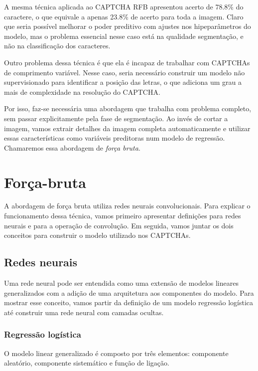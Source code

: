 \documentclass[12pt,]{report}
\begin{document}
A mesma técnica aplicada ao CAPTCHA RFB apresentou acerto de 78.8\% do
caractere, o que equivale a apenas 23.8\% de acerto para toda a imagem.
Claro que seria possível melhorar o poder preditivo com ajustes nos
hipeparâmetros do modelo, mas o problema essencial nesse caso está na
qualidade segmentação, e não na classificação dos caracteres.

Outro problema dessa técnica é que ela é incapaz de trabalhar com
CAPTCHAs de comprimento variável. Nesse caso, seria necessário construir
um modelo não supervisionado para identificar a posição das letras, o
que adiciona um grau a mais de complexidade na resolução do CAPTCHA.

Por isso, faz-se necessária uma abordagem que trabalha com problema
completo, sem passar explicitamente pela fase de segmentação. Ao invés
de cortar a imagem, vamos extrair detalhes da imagem completa
automaticamente e utilizar essas características como variáveis
preditoras num modelo de regressão. Chamaremos essa abordagem de
\emph{força bruta}.

\section{Força-bruta}\label{forca-bruta}

A abordagem de força bruta utiliza redes neurais convolucionais. Para
explicar o funcionamento dessa técnica, vamos primeiro apresentar
definições para redes neurais e para a operação de convolução. Em
seguida, vamos juntar os dois conceitos para construir o modelo
utilizado nos CAPTCHAs.

\subsection{Redes neurais}\label{redes-neurais}

Uma rede neural pode ser entendida como uma extensão de modelos lineares
generalizados com a adição de uma arquitetura aos componentes do modelo.
Para mostrar esse conceito, vamos partir da definição de um modelo
regressão logística até construir uma rede neural com camadas ocultas.

\subsubsection{Regressão logística}\label{regressao-logistica}

O modelo linear generalizado é composto por três elementos: componente
aleatório, componente sistemático e função de ligação.
\end{document}
